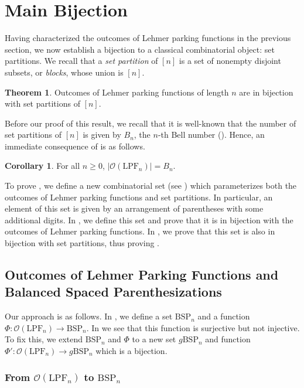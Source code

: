 \documentclass{amsart}
\newcommand{\seqnum}[1]{\href{http://oeis.org/#1}{\underline{#1}}}
\newcommand{\IT}{\mathrm{LPF}}
\newcommand{\BSP}{\mathrm{BSP}}
\newcommand{\GBSP}{g\mathrm{BSP}}
\newcommand{\Out}{\mathcal{O}}
\theoremstyle{definition}
\newtheorem{theorem}{Theorem}[section]
\newtheorem{corollary}{Corollary}[section]
\theoremstyle{definition}
\theoremstyle{remark}
\begin{document}
\section{Main Bijection}\label{sec:bijection}
Having characterized the outcomes of Lehmer parking functions in the previous section, we now establish a bijection to a classical combinatorial object: set partitions. 
We recall that a \textit{set partition} of $[n]$ is a set of nonempty disjoint subsets, or \textit{blocks}, whose union is $[n]$.
\begin{theorem}\label{thm:main bijection}
    Outcomes of Lehmer parking functions of length $n$ are in bijection with set partitions of $[n]$.
\end{theorem}

Before our proof of this result, we recall that it is well-known that the number of set partitions of $[n] $ is given by 
$B_n$, the $n$-th Bell number (\cite[\seqnum{A000110}]{OEIS}).
Hence, an immediate consequence of  is as follows.
\begin{corollary}
    For all $n\geq 0$, 
    $|\Out(\IT_n)| = B_n$.
\end{corollary}

To prove , we define a new combinatorial set (see ) which parameterizes both the outcomes of Lehmer parking functions and set partitions. In particular, an element of this set is given by an arrangement of parentheses with some additional digits. In , we define this set and prove that it is in bijection with the outcomes of Lehmer parking functions. In , we prove that this set is also in bijection with set partitions, thus proving .


\subsection{Outcomes of Lehmer Parking Functions and Balanced Spaced Parenthesizations}\label{sec:invPFoutcome}

Our approach is as follows. In , we define a set $\BSP_n$ and a function $\Phi:\Out(\IT_n)\to\BSP_n$. In  we see that this function is surjective but not injective. To fix this, we extend $\BSP_n$ and $\Phi$ to a new set $\GBSP_n$ and function $\Phi':\Out(\IT_n)\to\GBSP_n$ which is a bijection.



\subsubsection{From $\Out(\IT_n)$ to $\BSP_n$}\label{Out(IT) to BSP}
\end{document}

